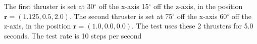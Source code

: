 The first thruster is set at 30$^\circ$ off the x-axis 15$^\circ$ off the z-axis, in the position $\bm r = \left(1.125,0.5,2.0\right)$. The second thruster is set at 75$^\circ$ off the x-axis 60$^\circ$ off the z-axis, in the position $\bm r = \left(1.0,0.0,0.0\right)$. The test uses these 2 thrusters for 5.0 seconds. The test rate is 10 steps per second